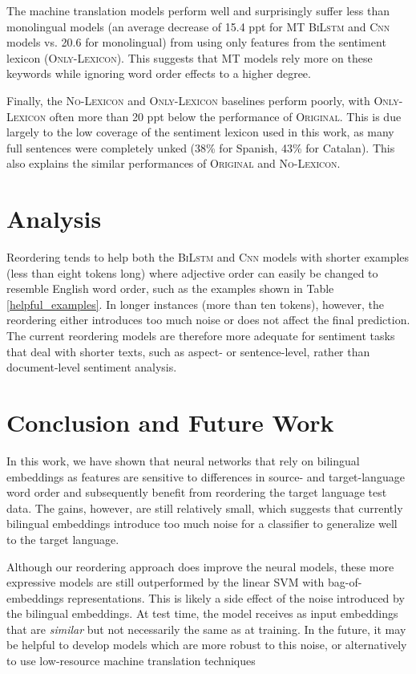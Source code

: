 \documentclass[a4paper,11pt,twocolumn,twoside]{article}
\newcommand{\original}{\textsc{Original}\xspace}
\newcommand{\onlylex}{\textsc{Only-Lexicon}\xspace}
\newcommand{\nolex}{\textsc{No-Lexicon}\xspace}
\newcommand{\bilstm}{\textsc{BiLstm}\xspace}
\newcommand{\cnn}{\textsc{Cnn}\xspace}
\begin{document}
The machine translation models perform well and surprisingly suffer less than monolingual models (an average decrease of 15.4 ppt for MT \bilstm and \cnn models vs. 20.6 for monolingual)  from using only features from the sentiment lexicon (\onlylex). This suggests that MT models rely more on these keywords while ignoring word order effects to a higher degree.

Finally, the \nolex and \onlylex baselines perform poorly, with \onlylex often more than 20 ppt below the performance of \original. This is due largely to the low coverage of the sentiment lexicon used in this work, as many full sentences were completely unked (38\% for Spanish, 43\% for Catalan). This also explains the similar performances of \original and \nolex.


\section{Analysis}

Reordering tends to help both the \bilstm and \cnn models with shorter examples (less than eight tokens long) where adjective order can easily be changed to resemble English word order, such as the examples shown in Table \ref{helpful_examples}. In longer instances (more than ten tokens), however, the reordering either introduces too much noise or does not affect the final prediction. The current reordering models are therefore more adequate for sentiment tasks that deal with shorter texts, such as aspect- or sentence-level, rather than document-level sentiment analysis.


\section{Conclusion and Future Work}

In this work, we have shown that neural networks that rely on bilingual embeddings as features
are sensitive to differences in source- and target-language word order and subsequently benefit from reordering the target language test data. The gains, however, are still relatively small, which suggests that currently bilingual embeddings introduce too much noise for a classifier to generalize well to the target language.

Although our reordering approach does improve the neural models, these more expressive models are still outperformed by the linear SVM with bag-of-embeddings representations. This is likely a side effect of the noise introduced by the bilingual embeddings. At test time, the model receives as input embeddings that are \emph{similar} but not necessarily the same as at training. In the future, it may be helpful to develop models which are more robust to this noise, or alternatively to use low-resource machine translation techniques \cite{artetxe2018iclr,lample2018unsupervised,artetxe2018emnlp,lample-etal-2018-phrase}
\end{document}
